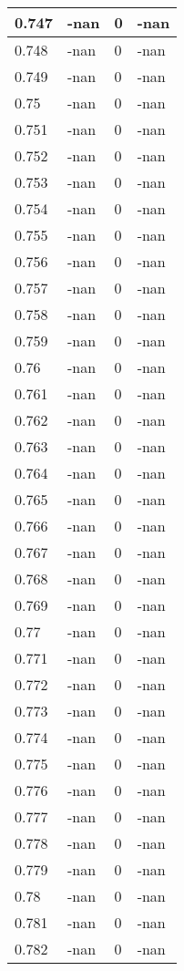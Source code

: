\documentclass[a4paper,14pt]{extarticle}
\begin{document}
\begin{longtable}{||m{3cm}||m{3cm}|m{3cm}||m{3cm}||}
\hline
0.747 & -nan & 0 & -nan\\
\hline
0.748 & -nan & 0 & -nan\\
\hline
0.749 & -nan & 0 & -nan\\
\hline
0.75 & -nan & 0 & -nan\\
\hline
0.751 & -nan & 0 & -nan\\
\hline
0.752 & -nan & 0 & -nan\\
\hline
0.753 & -nan & 0 & -nan\\
\hline
0.754 & -nan & 0 & -nan\\
\hline
0.755 & -nan & 0 & -nan\\
\hline
0.756 & -nan & 0 & -nan\\
\hline
0.757 & -nan & 0 & -nan\\
\hline
0.758 & -nan & 0 & -nan\\
\hline
0.759 & -nan & 0 & -nan\\
\hline
0.76 & -nan & 0 & -nan\\
\hline
0.761 & -nan & 0 & -nan\\
\hline
0.762 & -nan & 0 & -nan\\
\hline
0.763 & -nan & 0 & -nan\\
\hline
0.764 & -nan & 0 & -nan\\
\hline
0.765 & -nan & 0 & -nan\\
\hline
0.766 & -nan & 0 & -nan\\
\hline
0.767 & -nan & 0 & -nan\\
\hline
0.768 & -nan & 0 & -nan\\
\hline
0.769 & -nan & 0 & -nan\\
\hline
0.77 & -nan & 0 & -nan\\
\hline
0.771 & -nan & 0 & -nan\\
\hline
0.772 & -nan & 0 & -nan\\
\hline
0.773 & -nan & 0 & -nan\\
\hline
0.774 & -nan & 0 & -nan\\
\hline
0.775 & -nan & 0 & -nan\\
\hline
0.776 & -nan & 0 & -nan\\
\hline
0.777 & -nan & 0 & -nan\\
\hline
0.778 & -nan & 0 & -nan\\
\hline
0.779 & -nan & 0 & -nan\\
\hline
0.78 & -nan & 0 & -nan\\
\hline
0.781 & -nan & 0 & -nan\\
\hline
0.782 & -nan & 0 & -nan\\

\end{longtable}
\end{document}
